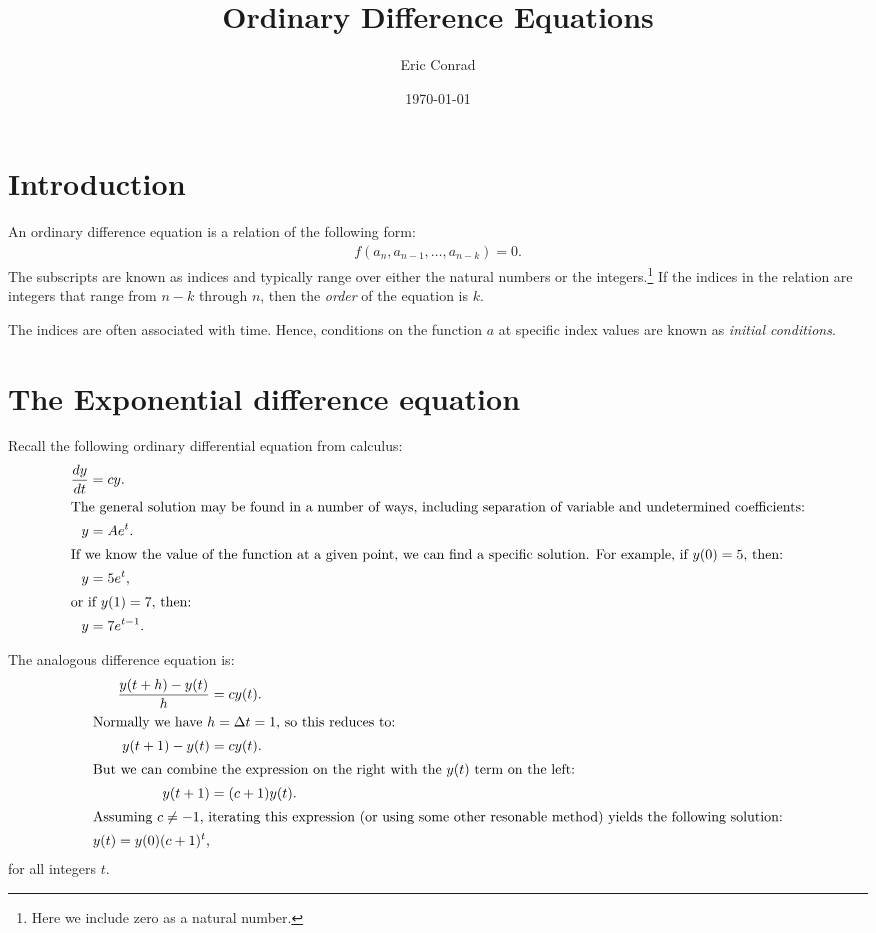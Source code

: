 \documentclass[12pt,letterpaper]{report}
\numberwithin{equation}{chapter}
\newcommand\chap[1]{%
	\chapter*{#1}%
	\addcontentsline{toc}{chapter}{#1}}
\begin{document}
\title{Ordinary Difference Equations}
\author{Eric Conrad}
\date{\today}
\maketitle

\tableofcontents

\chap{Introduction}

An ordinary difference equation is a relation of the following form:
\begin{align}
	f(a_n, a_{n-1}, \dots, a_{n-k}) = 0 \text{.}	\tag{A}
\end{align}
The subscripts are known as indices and typically range over either the natural numbers
or the integers.\footnote{Here we include zero as a natural number.}  If the indices
in the relation are integers that range from $n-k$ through $n$, then the \emph{order}
of the equation is $k$.

The indices are often associated with time.  Hence, conditions on the function $a$ at specific
index values are known as \emph{initial conditions}.

\chapter{The Exponential difference equation}

Recall the following ordinary differential equation from calculus:
\begin{align}
		\frac{dy}{dt} &= cy\text{.} \\
\intertext{The general solution may be found in a number of ways, including separation of
	variable and undetermined coefficients:}
		y &= Ae^t\text{.} \\
\intertext{If we know the value of the function at a given point, we can find a specific
	solution.  For example, if $y(0)=5$, then:}
		y &= 5e^t\text{,} \\
\intertext{or if $y(1)=7$, then:}
		y &= 7e^{t-1}\text{.}
\end{align}

The analogous difference equation is:
\begin{align}
		\frac{y(t+h)-y(t)}{h} &= cy(t)\text{.} \label{eqn:diffForm} \\
\intertext{Normally we have $h=\Delta t=1$, so this reduces to:}
		y(t+1)-y(t) &= cy(t)\text{.} \\
\intertext{But we can combine the expression on the right with the $y(t)$ term on the left:}
		y(t+1) &= (c+1)y(t) \text{.} \\
\intertext{Assuming $c\neq -1$, iterating this expression (or using some other resonable method)
	yields the following solution:}
		y(t) = y(0) (c+1)^t\text{,}
\end{align}
{for all integers $t$.}	
\end{document}
